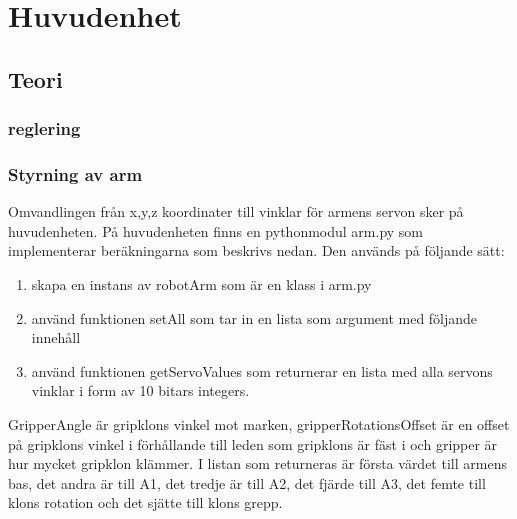 
\section{Huvudenhet}

\subsection{Teori}

\subsubsection{reglering}

\subsubsection{Styrning av arm}
 Omvandlingen från x,y,z koordinater till vinklar för armens servon sker på huvudenheten. På huvudenheten finns en pythonmodul arm.py som implementerar beräkningarna som beskrivs nedan. Den används på följande sätt:
 \begin{enumerate}
 \item skapa en instans av robotArm som är en klass i arm.py
 \item använd funktionen setAll som tar in en lista som argument med följande innehåll 
 \item använd funktionen getServoValues som returnerar en lista med alla servons vinklar i form av 10 bitars integers. 
 \end{enumerate}
GripperAngle är gripklons vinkel mot marken, gripperRotationsOffset är en offset på gripklons vinkel i förhållande till leden som gripklons är fäst i och gripper är hur mycket gripklon klämmer. 
\newline
\newline
I listan som returneras är första värdet till armens bas, det andra är till A1, det tredje är till A2, det fjärde till A3, det femte till klons rotation och det sjätte till klons grepp.



